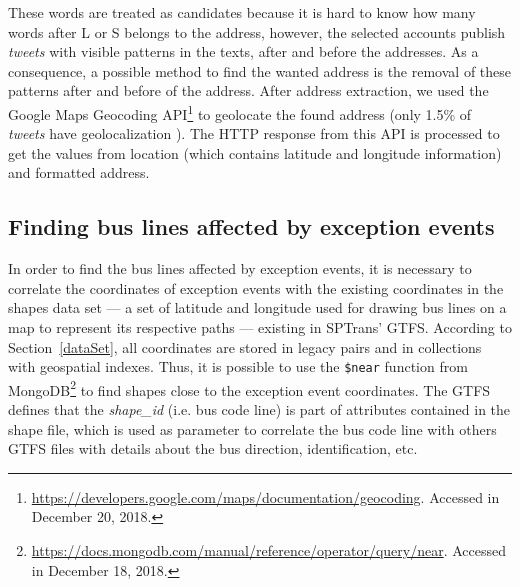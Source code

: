 \documentclass[runningheads]{llncs}
\begin{document}
These words are treated as candidates because it is hard to know how many words after L or S belongs to the address, however, the selected accounts publish \textit{tweets} with visible patterns in the texts, after and before the addresses. As a consequence, a possible method to find the wanted address is the removal of these patterns after and before of the address. After address extraction, we used the Google Maps Geocoding API\footnote{\url{https://developers.google.com/maps/documentation/geocoding}. Accessed in December 20, 2018.} to geolocate the found address (only 1.5\% of \textit{tweets} have geolocalization \cite{niu2016community}).
The HTTP response from this API is processed to get the values from location (which contains latitude and longitude information) and formatted address.


\subsection{Finding bus lines affected by exception events}

In order to find the bus lines affected by exception events, it is necessary to correlate the coordinates of exception events with the existing coordinates in the shapes data set --- a set of latitude and longitude used for drawing bus lines on a map to represent its respective paths --- existing in SPTrans' GTFS. According to Section~\ref{dataSet}, all coordinates are stored in legacy pairs and in collections with geospatial indexes. Thus, it is possible to use the \texttt{\$near} function from MongoDB\footnote{\url{https://docs.mongodb.com/manual/reference/operator/query/near}. Accessed in December 18, 2018.} to find shapes close to the exception event coordinates. The GTFS defines that the \textit{shape\_id} (i.e. bus code line) is part of attributes contained in the shape file, which is used as parameter to correlate the bus code line with others GTFS files with details about the bus direction, identification, etc.
\end{document}
